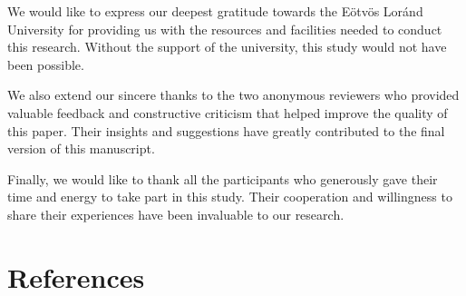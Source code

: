 \documentclass{article}
\begin{document}
We would like to express our deepest gratitude towards the Eötvös Loránd University for providing us with the resources and facilities needed to conduct this research. Without the support of the university, this study would not have been possible.

We also extend our sincere thanks to the two anonymous reviewers who provided valuable feedback and constructive criticism that helped improve the quality of this paper. Their insights and suggestions have greatly contributed to the final version of this manuscript.

Finally, we would like to thank all the participants who generously gave their time and energy to take part in this study. Their cooperation and willingness to share their experiences have been invaluable to our research.

\maketitle

\section{References}

\printbibliography
\end{document}
